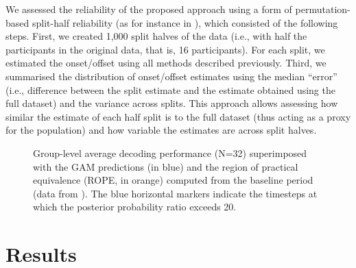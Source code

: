 \documentclass[
  man,
  floatsintext,
  longtable,
  a4paper,
  nolmodern,
  notxfonts,
  notimes,
  colorlinks=true,linkcolor=blue,citecolor=blue,urlcolor=blue]{apa7}
\begin{document}
We assessed the reliability of the proposed approach using a form of
permutation-based split-half reliability (as for instance in
), which consisted
of the following steps. First, we created 1,000 split halves of the data
(i.e., with half the participants in the original data, that is, 16
participants). For each split, we estimated the onset/offset using all
methods described previously. Third, we summarised the distribution of
onset/offset estimates using the median ``error'' (i.e., difference
between the split estimate and the estimate obtained using the full
dataset) and the variance across splits. This approach allows assessing
how similar the estimate of each half split is to the full dataset (thus
acting as a proxy for the population) and how variable the estimates are
across split halves.

\begin{figure}[!htb]

\caption{\label{fig-decoding-data}Group-level average decoding
performance (N=32) superimposed with the GAM predictions (in blue) and
the region of practical equivalence (ROPE, in orange) computed from the
baseline period (data from ). The blue horizontal markers indicate the
timesteps at which the posterior probability ratio exceeds 20.}


\end{figure}%

\newpage

\section{Results}\label{results}
\end{document}
